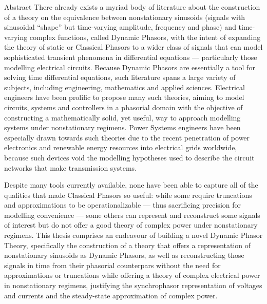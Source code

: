 \documentclass{apaThesis}
\begin{document}
\begin{newabstract}{Abstract}
	There already exists a myriad body of literature about the construction of a theory on the equivalence between nonstationary sinusoids (signals with sinusoidal ``shape'' but time-varying amplitude, frequency and phase) and time-varying complex functions, called Dynamic Phasors, with the intent of expanding the theory of static or Classical Phasors to a wider class of signals that can model sophisticated transient phenomena in differential equations — particularly those modelling electrical circuits. Because Dynamic Phasors are essentially a tool for solving time differential equations, such literature spans a large variety of subjects, including engineering, mathematics and applied sciences. Electrical engineers have been prolific to propose many such theories, aiming to model circuits, systems and controllers in a phasorial domain with the objective of constructing a mathematically solid, yet useful, way to approach modelling systems under nonstationary regimens. Power Systems engineers have been especially drawn towards such theories due to the recent penetration of power electronics and renewable energy resources into electrical grids worldwide, because such devices void the modelling hypotheses used to describe the circuit networks that make transmission systems.

	Despite many tools currently available, none have been able to capture all of the qualities that made Classical Phasors so useful: while some require truncations and approximations to be operationalizable — thus sacrificing precision for modelling convenience — some others can represent and reconstruct some signals of interest but do not offer a good theory of complex power under nonstationary regimens. This thesis comprises an endeavour of building a novel Dynamic Phasor Theory, specifically the construction of a theory that offers a representation of nonstationary sinusoids as Dynamic Phasors, as well as reconstructing those signals in time from their phasorial counterpars without the need for approximations or truncations while offering a theory of complex electrical power in nonstationary regimens, justifying the synchrophasor representation of voltages and currents and the steady-state approximation of complex power.


\end{newabstract}
\end{document}
